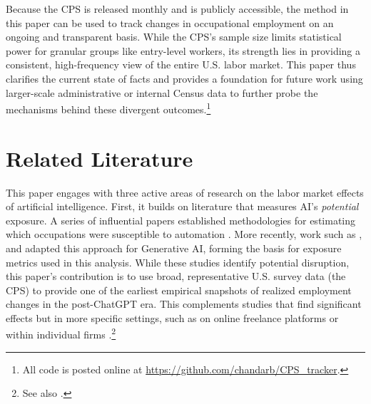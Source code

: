 \documentclass[12pt]{article}
\numberwithin{equation}{section}
\theoremstyle{theorem}\newcustomtheorem{theorem}{{\bf\sc Theorem}}
\theoremstyle{definition}\newcustomtheorem{assumption}{{\bf\sc Assumption}}
\theoremstyle{theorem} \newcustomtheorem{proposition}{{\bf\sc Proposition}}
\begin{document}
Because the CPS is released monthly and is publicly accessible, the method in this paper can be used to track changes in occupational employment on an ongoing and transparent basis. While the CPS's sample size limits statistical power for granular groups like entry-level workers, its strength lies in providing a consistent, high-frequency view of the entire U.S. labor market. This paper thus clarifies the current state of facts and provides a foundation for future work using larger-scale administrative or internal Census data to further probe the mechanisms behind these divergent outcomes.\footnote{All code is posted online at \url{https://github.com/chandarb/CPS_tracker}.} 

\section{Related Literature}

This paper engages with three active areas of research on the labor market effects of artificial intelligence. First, it builds on literature that measures AI's \emph{potential} exposure. A series of influential papers established methodologies for estimating which occupations were susceptible to automation \citep{frey_future_2017,brynjolfsson_what_2018,felten_method_2018, felten_occupational_2019,webb_impact_2019,felten_occupational_2021}. More recently, work such as \citet{eloundou_gpts_2024, felten_how_2023, gmyrek_generative_2023}, and \citet{gmyrek_generative_2025} adapted this approach for Generative AI, forming the basis for exposure metrics used in this analysis. While these studies identify potential disruption, this paper's contribution is to use broad, representative U.S. survey data (the CPS) to provide one of the earliest empirical snapshots of realized employment changes in the post-ChatGPT era. This complements studies that find significant effects but in more specific settings, such as on online freelance platforms \citep{hui_short-term_2023} or within individual firms \citep{brynjolfsson_generative_2025,dillon2025early}.\footnote{See also \citet{noy_experimental_2023,peng_impact_2023,dellacqua_navigating_2023}.}
\end{document}
